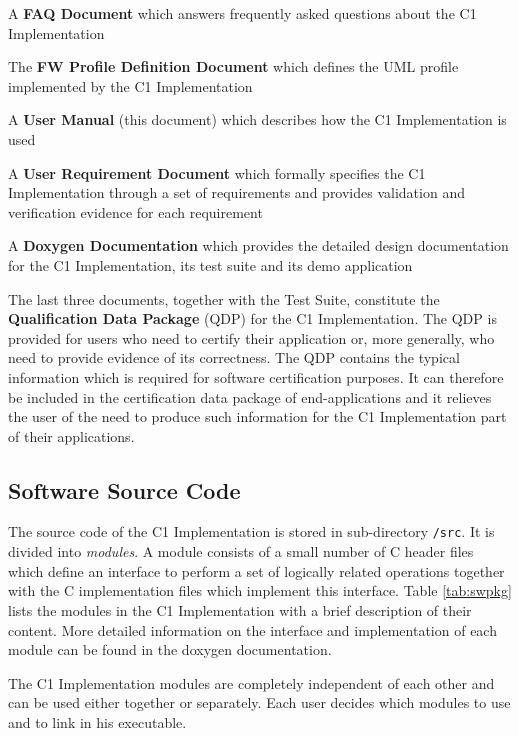 \documentclass[manual]{../fwprofile}
\begin{document}
\begin{fw_itemize}
\item A \textbf{FAQ Document} which answers frequently asked questions about the C1 Implementation
\item The \textbf{FW Profile Definition Document} which defines the UML profile implemented by the C1 Implementation
\item A \textbf{User Manual} (this document) which describes how the C1 Implementation is used
\item A \textbf{User Requirement Document} which formally specifies the C1 Implementation
through a set of requirements and provides validation and verification evidence for each requirement
\item A \textbf{Doxygen Documentation} which provides the detailed design documentation for the C1 Implementation, its test suite and its demo application
\end{fw_itemize}

The last three documents, together with the Test Suite, constitute the \textbf{Qualification Data Package} (QDP) for the C1 Implementation. The QDP is provided for users who need to certify their application or, more generally, who need to provide evidence of its correctness. The QDP contains the typical information which is required for software certification purposes. It can therefore be included in the certification data package of end-applications and it relieves the user of the need to produce such information for the C1 Implementation part of their applications.

\subsection{Software Source Code}\label{sec:sourceCode}
The source code of the C1 Implementation is stored in sub-directory \texttt{/src}. It is divided into \emph{modules}. A module consists of a small number of C header files which define an interface to perform a set of logically related operations together with the C implementation files which implement this interface. Table \ref{tab:swpkg} lists the modules in the C1 Implementation with a brief description of their content. More detailed information on the interface and implementation of each module can be found in the doxygen documentation.

The C1 Implementation modules are completely independent of each other and can be used either together or separately. Each user decides which modules to use and to link in his executable.
\end{document}
